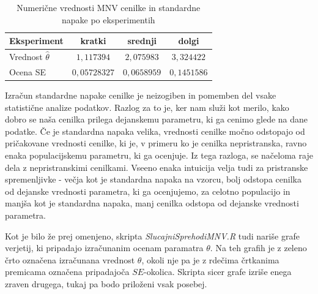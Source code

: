 \documentclass[a4paper, 10pt]{article}
\begin{document}
	\begin{table}[h!]
		\label{tab: mnvse}
		\centering
		\begin{tabular}{|l|c|c|c|}
			\hline
			Eksperiment & kratki & srednji & dolgi \\ \hline
			Vrednost $\widehat{\theta}$ & $1{,}117394$ & $2{,}075983$ & $3{,}324422$ \\ \hline
			Ocena SE & $0{,}05728327$ & $0{,}0658959$ & $0{,}1451586$ \\ \hline
		\end{tabular}
		\caption{Numerične vrednosti MNV cenilke in standardne napake po eksperimentih}
	\end{table}
	
	Izračun standardne napake cenilke je neizogiben in pomemben del vsake statistične analize podatkov. Razlog za to je, ker nam služi kot merilo, kako dobro se naša cenilka prilega dejanskemu parametru, ki ga cenimo glede na dane podatke. Če je standardna napaka velika, vrednosti cenilke močno odstopajo od pričakovane vrednosti cenilke, ki je, v primeru ko je cenilka nepristranska, ravno enaka populacijskemu parametru, ki ga ocenjuje. Iz tega razloga, se načeloma raje dela z nepristranskimi cenilkami. Vseeno enaka intuicija velja tudi za pristranske spremenljivke - večja kot je standardna napaka na vzorcu, bolj odstopa cenilka od dejanske vrednosti parametra, ki ga ocenjujemo, za celotno populacijo in manjša kot je standardna napaka, manj cenilka odstopa od dejanske vrednosti parametra.
	
	Kot je bilo že prej omenjeno, skripta \textit{SlucajniSprehodiMNV.R} tudi nariše grafe verjetij, ki pripadajo izračunanim ocenam paramatra $\theta$. Na teh grafih je z zeleno črto označena izračunana vrednost $\theta$, okoli nje pa je z rdečima črtkanima premicama označena pripadajoča $SE$-okolica. Skripta sicer grafe izriše enega zraven drugega, tukaj pa bodo priloženi vsak posebej.
	
\end{document}
